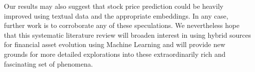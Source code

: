 \documentclass[11pt]{article}
\begin{document}
Our results may also suggest that stock price prediction could be heavily improved using textual data and the appropriate embeddings. In any case, further work is to corroborate any of these speculations.
We nevertheless hope that this systematic literature review will broaden interest in using hybrid sources for financial asset evolution using Machine Learning and will provide new grounds for more detailed explorations into these extraordinarily rich and fascinating set of phenomena.

\nocite{*}
\begin{doublespacing}

%

\end{doublespacing}

\clearpage


\clearpage


\end{document}
